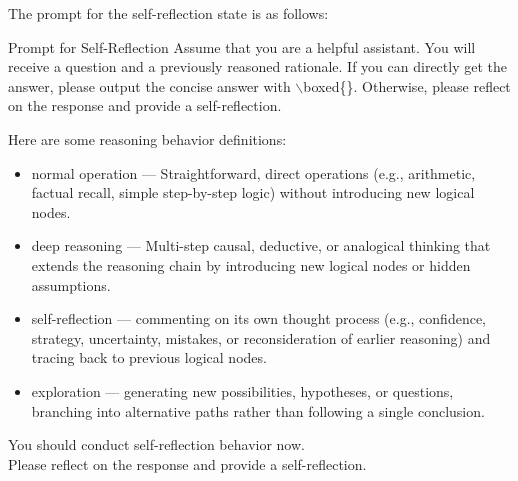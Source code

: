 The prompt for the self-reflection state is as follows:

\begin{PromptBox}{Prompt for Self-Reflection}
Assume that you are a helpful assistant. You will receive a question and a previously reasoned rationale. If you can directly get the answer, please output the concise answer with $\backslash$boxed\{\}. Otherwise, please reflect on the response and provide a self-reflection.

Here are some reasoning behavior definitions:
\begin{itemize}[leftmargin=16pt, itemsep=0pt, topsep=0pt]
    \item normal operation — Straightforward, direct operations (e.g., arithmetic, factual recall, simple step-by-step logic) without introducing new logical nodes.
    \item deep reasoning — Multi-step causal, deductive, or analogical thinking that extends the reasoning chain by introducing new logical nodes or hidden assumptions.
    \item self-reflection — commenting on its own thought process (e.g., confidence, strategy, uncertainty, mistakes, or reconsideration of earlier reasoning) and tracing back to previous logical nodes.
    \item exploration — generating new possibilities, hypotheses, or questions, branching into alternative paths rather than following a single conclusion.
\end{itemize}

You should conduct self-reflection behavior now.\\

Please reflect on the response and provide a self-reflection.
\end{PromptBox}

